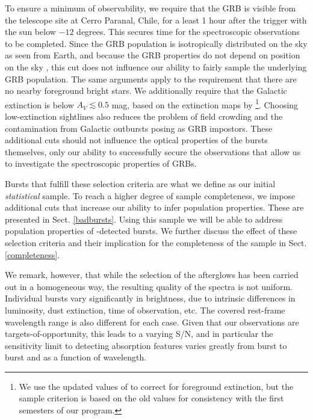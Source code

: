 \documentclass[longauth]{aa}    %
\begin{document}
To ensure a minimum of observability, we require that the GRB is visible from
the telescope site at Cerro Paranal, Chile, for a least 1 hour after the trigger
with the sun below $-12$ degrees. This secures time for the spectroscopic
observations to be completed. Since the GRB population is isotropically
distributed on the sky as seen from Earth, and because the GRB properties do not
depend on position on the sky \citep{Meegan1992, Briggs1996, Ukwatta2016}, this
cut does not influence our ability to fairly sample the underlying GRB
population. The same arguments apply to the requirement that there are no nearby
foreground bright stars. We additionally require that the Galactic extinction is
below $A_V \lesssim 0.5$ mag, based on the extinction maps by
\citet{Schlegel1998}\footnote{We use the updated values of \citet{Schlafly2011}
	to correct for foreground extinction, but the sample criterion is based on the
	old \citet{Schlegel1998} values for consistency with the first semesters of our
	program.}. Choosing low-extinction sightlines also reduces the problem of field
crowding and the contamination from Galactic outbursts posing as GRB impostors.
These additional cuts should not influence the optical properties of the bursts
themselves, only our ability to successfully secure the observations that allow
us to investigate the spectroscopic properties of GRBs.

Bursts that fulfill these selection criteria are what we define as our initial
\textit{statistical} sample. To reach a higher degree of sample completeness, we
impose additional cuts that increase our ability to infer population properties.
These are presented in Sect. \ref{badbursts}. Using this sample we will be able
to address population properties of \swift-detected bursts. We further discuss
the effect of these selection criteria and their implication for the
completeness of the sample in Sect. \ref{completeness}.

We remark, however, that while the selection of the afterglows has been carried
out in a homogeneous way, the resulting quality of the spectra is not uniform.
Individual bursts vary significantly in brightness, due to intrinsic
differences in luminosity, dust extinction, time of observation, etc. The covered
rest-frame wavelength range is also different for each case. Given that our
observations are targets-of-opportunity, this leads to a varying S/N, and in
particular the sensitivity limit to detecting absorption features varies greatly
from burst to burst and as a function of wavelength.
\end{document}
